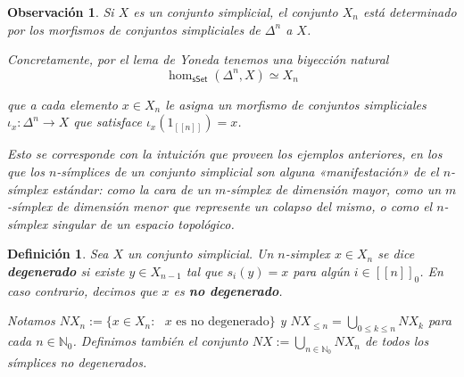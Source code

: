 \documentclass[11pt]{report}
\theoremstyle{colored}
\newtheorem{definition}{Definición}[section]
\newtheorem{remark}{Observación}[section]
\newcommand{\N}{\mathbb{N}}
\newcommand{\nat}[1]{[\![#1]\!]}
\newcommand{\ord}[1]{\nat{#1}}
\newcommand{\natzero}[1]{\nat{#1}_0}
\newcommand{\cat}[1]{\mathsf{#1}}
\renewcommand{\ss}[1]{\Delta^{#1}}
\begin{document}
\begin{remark} Si $X$ es un conjunto simplicial, el conjunto $X_n$ está determinado por los morfismos de conjuntos simpliciales de $\ss{n}$ a $X$. 

Concretamente, por el lema de Yoneda tenemos una biyección natural
\[
\hom_{\cat{sSet}}(\ss{n},X) \simeq X_n
\]

que a cada elemento $x \in X_n$ le asigna un morfismo de conjuntos simpliciales $\iota_x : \ss{n} \to X$ que satisface $\iota_x(1_{\ord{n}}) = x$. 

Esto se corresponde con la intuición que proveen los ejemplos anteriores, en los que los $n$-símplices de un conjunto simplicial son alguna «manifestación» de el $n$-símplex estándar: como la cara de un $m$-símplex de dimensión mayor, como un $m$-símplex de dimensión menor que represente un colapso del mismo, o como el $n$-símplex singular de un espacio topológico.\\
\end{remark}

\begin{definition} Sea $X$ un conjunto simplicial. Un $n$-simplex $x \in X_n$ se dice \textbf{degenerado} si existe $y \in X_{n-1}$ tal que $s_i(y) = x$ para algún $i \in \natzero{n}$. En caso contrario, decimos que $x$ es \textbf{no degenerado}. 

Notamos $NX_n := \{x \in X_n : \text{ $x$ es no degenerado}\}$ y $NX_{\leq n} = \bigcup_{0 \leq k \leq n}NX_k$ para cada $n \in \N_0$. Definimos también el conjunto $NX := \bigcup_{n \in \N_0}NX_n$ de todos los símplices no degenerados.
\end{definition}
\end{document}
